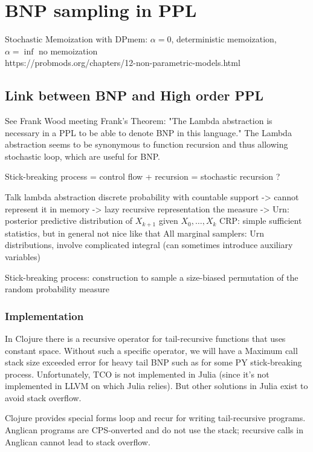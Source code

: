 
\chapter{BNP sampling in PPL}

Stochastic Memoization with DPmem: $\alpha = 0$, deterministic memoization, $\alpha = \inf$ no memoization\\
https://probmods.org/chapters/12-non-parametric-models.html


\section{Link between BNP and High order PPL}
See Frank Wood meeting
Frank's Theorem: "The Lambda abstraction is necessary in a PPL to be able to denote BNP in this language." The Lambda abstraction seems to be synonymous to function recursion and thus allowing stochastic loop, which are useful for BNP.

Stick-breaking process = control flow + recursion = stochastic recursion ?

Talk lambda abstraction
discrete probability with countable support -> cannot represent it in memory
-> lazy recursive representation the measure
-> Urn: posterior predictive distribution of $X_{k+1}$ given $X_0, \dots, X_{k}$
CRP: simple sufficient statistics, but in general not nice like that
All marginal samplers: Urn distributions, involve complicated integral (can sometimes introduce auxiliary variables)

Stick-breaking process: construction to sample a size-biased permutation of the random probability measure

\subsection{Implementation}
In Clojure there is a recursive operator for tail-recursive functions that uses constant space. Without such a specific operator, we will have a Maximum call stack size exceeded error for heavy tail BNP such as for some PY stick-breaking process. Unfortunately, \gls{TCO} is not implemented in Julia (since it's not implemented in LLVM on which Julia relies). But other solutions in Julia exist to avoid stack overflow.

Clojure provides special forms loop and recur for writing tail-recursive programs. Anglican programs are \gls{CPS}-onverted and do not use the stack; recursive calls in Anglican cannot lead to stack overflow.

